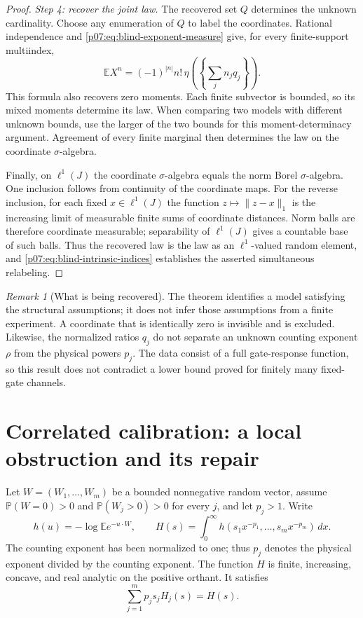 \documentclass[11pt,letterpaper]{article}
\theoremstyle{definition}
\theoremstyle{remark}
\newtheorem{remark}[theorem]{Remark}
\newcommand{\E}{\mathbb E}
\newcommand{\1}{\mathbf 1}
\begin{document}
\begin{proof}
\emph{Step 4: recover the joint law.}
The recovered set $Q$ determines the unknown cardinality. Choose any
enumeration of $Q$ to label the coordinates. Rational independence and
\eqref{p07:eq:blind-exponent-measure} give, for every finite-support
multiindex,
\begin{equation}\label{p07:eq:blind-cylinder-moments}
 \E X^n=(-1)^{|n|}n!\,
          \eta\left(\left\{\sum_jn_jq_j\right\}\right).
\end{equation}
This formula also recovers zero moments. Each finite subvector is
bounded, so its mixed moments determine its law. When comparing two
models with different unknown bounds, use the larger of the two bounds
for this moment-determinacy argument. Agreement of every finite marginal
then determines the law on the coordinate $\sigma$-algebra.

Finally, on $\ell^1(J)$ the coordinate $\sigma$-algebra equals the norm
Borel $\sigma$-algebra. One inclusion follows from continuity of the
coordinate maps. For the reverse inclusion, for each fixed
$x\in\ell^1(J)$ the function $z\mapsto\|z-x\|_1$ is the increasing
limit of measurable finite sums of coordinate distances. Norm balls
are therefore coordinate measurable; separability of $\ell^1(J)$ gives
a countable base of such balls. Thus the recovered law is the law as an
$\ell^1$-valued random element, and \eqref{p07:eq:blind-intrinsic-indices}
establishes the asserted simultaneous relabeling.
\end{proof}

\begin{remark}[What is being recovered]
The theorem identifies a model satisfying the structural assumptions;
it does not infer those assumptions from a finite experiment. A
coordinate that is identically zero is invisible and is excluded.
Likewise, the normalized ratios $q_j$ do not separate an unknown
counting exponent $\rho$ from the physical powers $p_j$. The data consist
of a full gate-response function, so this result does not contradict a
lower bound proved for finitely many fixed-gate channels.
\end{remark}

\section{Correlated calibration: a local obstruction and its repair}
\label{p07:sec:correlated-calibration}

Let $W=(W_1,\ldots,W_m)$ be a bounded nonnegative random vector,
assume $\mathbb P(W=0)>0$ and $\mathbb P(W_j>0)>0$ for every $j$,
and let $p_j>1$.  Write
\[
 h(u)=-\log\mathbb E e^{-u\cdot W},\qquad
 H(s)=\int_0^\infty h(s_1x^{-p_1},\ldots,s_mx^{-p_m})\,dx.
\]
The counting exponent has been normalized to one; thus $p_j$ denotes
the physical exponent divided by the counting exponent.  The function
$H$ is finite, increasing, concave, and real analytic on the positive
orthant.  It satisfies
\begin{equation}\label{p07:eq:vector-weighted-euler}
 \sum_{j=1}^m p_j s_j H_j(s)=H(s).
\end{equation}
\end{document}
